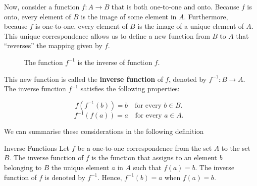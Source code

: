 Now, consider a function \( f: A \rightarrow B \) that is both one-to-one and onto. Because \( f \) is onto, every element of \( B \) is the image of some element in \( A \). Furthermore, because \( f \) is one-to-one, every element of \( B \) is the image of a unique element of \( A \). This unique correspondence allows us to define a new function from \( B \) to \( A \) that ``reverses'' the mapping given by \( f \).

\begin{figure}[htbp]
\centering
{}
\caption{The function $f^{-1}$ is the inverse of function $f$.}
\label{fig:inv}
\end{figure}

This new function is called the \textbf{inverse function} of \( f \), denoted by \( f^{-1}: B \rightarrow A \). The inverse function \( f^{-1} \) satisfies the following properties:

\[
f(f^{-1}(b)) = b \quad \text{for every } b \in B.
\]
\[
f^{-1}(f(a)) = a \quad \text{for every } a \in A.
\]

We can summarise these considerations in the following definition

\begin{definition}{Inverse Functions}
Let $f$ be a one-to-one correspondence from the set $A$ to the set $B$. The inverse function of $f$ is the function that assigns to an element $b$ belonging to $B$ the unique element $a$ in $A$ such that $f(a)=b$. The inverse function of $f$ is denoted by $f^{-1}$. Hence, $f^{-1}(b)=a$ when $f(a)=b$.    
\end{definition}

